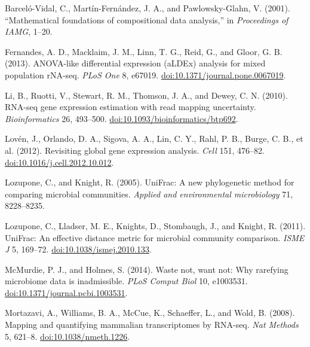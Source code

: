 \documentclass[twocolumn]{article}
\begin{document}
Barceló-Vidal, C., Martín-Fernández, J. A., and Pawlowsky-Glahn, V.
(2001). ``Mathematical foundations of compositional data analysis,'' in
\emph{Proceedings of IAMG}, 1--20.

Fernandes, A. D., Macklaim, J. M., Linn, T. G., Reid, G., and Gloor, G.
B. (2013). ANOVA-like differential expression (aLDEx) analysis for mixed
population rNA-seq. \emph{PLoS One} 8, e67019.
\href{http://doi.org/10.1371/journal.pone.0067019}{doi:10.1371/journal.pone.0067019}.

Li, B., Ruotti, V., Stewart, R. M., Thomson, J. A., and Dewey, C. N.
(2010). RNA-seq gene expression estimation with read mapping
uncertainty. \emph{Bioinformatics} 26, 493--500.
\href{http://doi.org/10.1093/bioinformatics/btp692}{doi:10.1093/bioinformatics/btp692}.

Lovén, J., Orlando, D. A., Sigova, A. A., Lin, C. Y., Rahl, P. B.,
Burge, C. B., et al. (2012). Revisiting global gene expression analysis.
\emph{Cell} 151, 476--82.
\href{http://doi.org/10.1016/j.cell.2012.10.012}{doi:10.1016/j.cell.2012.10.012}.

Lozupone, C., and Knight, R. (2005). UniFrac: A new phylogenetic method
for comparing microbial communities. \emph{Applied and environmental
microbiology} 71, 8228--8235.

Lozupone, C., Lladser, M. E., Knights, D., Stombaugh, J., and Knight, R.
(2011). UniFrac: An effective distance metric for microbial community
comparison. \emph{ISME J} 5, 169--72.
\href{http://doi.org/10.1038/ismej.2010.133}{doi:10.1038/ismej.2010.133}.

McMurdie, P. J., and Holmes, S. (2014). Waste not, want not: Why
rarefying microbiome data is inadmissible. \emph{PLoS Comput Biol} 10,
e1003531.
\href{http://doi.org/10.1371/journal.pcbi.1003531}{doi:10.1371/journal.pcbi.1003531}.

Mortazavi, A., Williams, B. A., McCue, K., Schaeffer, L., and Wold, B.
(2008). Mapping and quantifying mammalian transcriptomes by RNA-seq.
\emph{Nat Methods} 5, 621--8.
\href{http://doi.org/10.1038/nmeth.1226}{doi:10.1038/nmeth.1226}.
\end{document}
